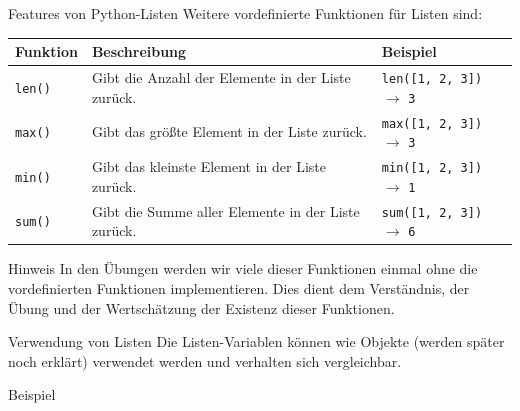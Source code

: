 \documentclass[xelatex,aspectratio=169]{beamer}
\begin{document}
\begin{frame}{Features von Python-Listen}
  Weitere vordefinierte Funktionen für Listen sind:
  \begin{tabularx}{\textwidth}{lXl}
    \toprule
    \textbf{Funktion} & \textbf{Beschreibung}                              & \textbf{Beispiel}                                \\
    \midrule
    \texttt{len()}    & Gibt die Anzahl der Elemente in der Liste zurück.  & \texttt{len([1, 2, 3])} $\rightarrow$ \texttt{3} \\
    \texttt{max()}    & Gibt das größte Element in der Liste zurück.       & \texttt{max([1, 2, 3])} $\rightarrow$ \texttt{3} \\
    \texttt{min()}    & Gibt das kleinste Element in der Liste zurück.     & \texttt{min([1, 2, 3])} $\rightarrow$ \texttt{1} \\
    \texttt{sum()}    & Gibt die Summe aller Elemente in der Liste zurück. & \texttt{sum([1, 2, 3])} $\rightarrow$ \texttt{6} \\
    \bottomrule
  \end{tabularx}

  \begin{exampleblock}{Hinweis}
    In den Übungen werden wir viele dieser Funktionen einmal ohne die vordefinierten Funktionen implementieren.
    Dies dient dem Verständnis, der Übung und der Wertschätzung der Existenz dieser Funktionen.
  \end{exampleblock}
\end{frame}

\begin{frame}{Verwendung von Listen}
  Die Listen-Variablen können wie Objekte (werden später noch erklärt) verwendet werden und verhalten sich vergleichbar.

  \begin{exampleblock}{Beispiel}
    \inputminted[escapeinside=??]{python}{src/algorithmus_list_methods.py}

  \end{exampleblock}

\end{frame}
\end{document}
